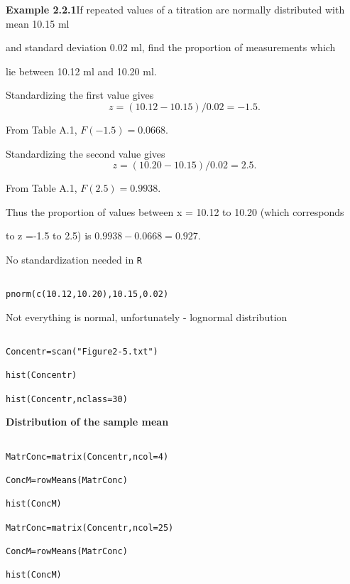  



\textbf{Example 2.2.1}If repeated values of a titration are normally distributed with mean 10.15 ml

and standard deviation 0.02 ml, find the proportion of measurements which

lie between 10.12 ml and 10.20 ml.

 

Standardizing the first value gives \[z = (10.12 - 10.15)/0.02 = -1.5.\]

From Table A.1, $F(-1.5) = 0.0668$.

 

Standardizing the second value gives \[ z = (10.20 - 10.15)/0.02 = 2.5.\]

From Table A.1, $F(2.5) = 0.9938$.

 

Thus the proportion of values between x = 10.12 to 10.20 (which corresponds

to z =-1.5 to 2.5) is $0.9938 - 0.0668 = 0.927$.

 

No standardization needed in \texttt{R}

\begin{verbatim}

pnorm(c(10.12,10.20),10.15,0.02)

\end{verbatim}

 

Not everything is normal, unfortunately - lognormal distribution

\begin{verbatim}

Concentr=scan("Figure2-5.txt")

hist(Concentr)

hist(Concentr,nclass=30)

\end{verbatim}

 

\textbf{Distribution of the sample mean}

\begin{verbatim}

MatrConc=matrix(Concentr,ncol=4)

ConcM=rowMeans(MatrConc)

hist(ConcM)

MatrConc=matrix(Concentr,ncol=25)

ConcM=rowMeans(MatrConc)

hist(ConcM)

\end{verbatim}

